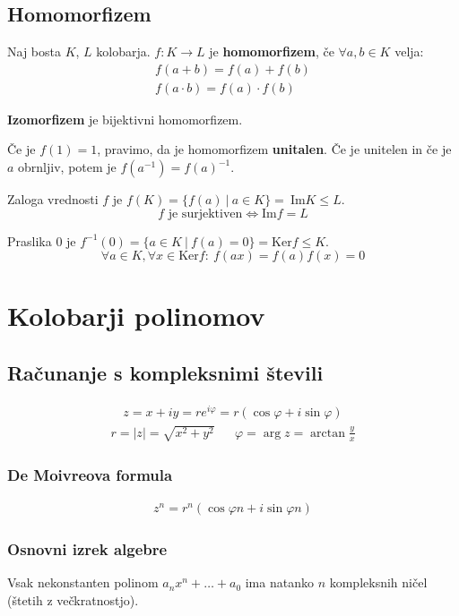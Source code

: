 	\subsection*{Homomorfizem}
	Naj bosta $K$, $L$ kolobarja. $f:K \to L$ je \textbf{homomorfizem}, če $\forall a, b \in K$ velja:
	\begin{gather*}
		f(a+b) = f(a) + f(b)\\
		f(a \cdot b) = f(a) \cdot f(b)
	\end{gather*}

	\textbf{Izomorfizem} je bijektivni homomorfizem.

	Če je $f(1) = 1$, pravimo, da je homomorfizem \textbf{unitalen}. Če je unitelen in če je $a$ obrnljiv, potem je $f(a^{-1}) = f(a)^{-1}$.

	Zaloga vrednosti $f$ je $f(K) = \{ f(a)\ |\ a \in K\} = \ \text{Im}K \leq L$.
	\[ f \text{ je surjektiven} \iff \text{Im}f = L\]

	Praslika 0 je $f^{-1}(0) = \{ a \in K \ |\ f(a) = 0\} = \text{Ker}f \leq K$.
	\[ \forall a \in K, \forall x \in \text{Ker} f:\ f(ax) = f(a)f(x) = 0\]

	\section{Kolobarji polinomov}
	\subsection*{Računanje s kompleksnimi števili}
	\begin{gather*}
		z = x + iy = r e^{i\varphi} = r\left( \cos \varphi + i \sin \varphi \right)
	\end{gather*}
	\begin{align*}
		r = |z| = \sqrt{x^2 + y^2} && \varphi = \arg z = \arctan \frac{y}{x}
	\end{align*}

	\subsubsection*{De Moivreova formula}
	\begin{align*}
		z^n = r^n\left( \cos \varphi n + i \sin \varphi n \right)
	\end{align*}

	\subsubsection*{Osnovni izrek algebre}
	Vsak nekonstanten polinom $a_n x^n + \dots + a_0$ ima natanko $n$ kompleksnih ničel (štetih z večkratnostjo).


